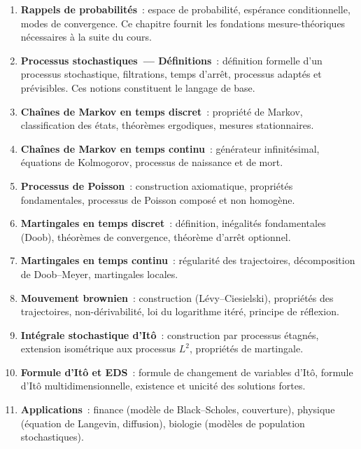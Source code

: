 \begin{enumerate}
  \item \textbf{Rappels de probabilit\'es}~: espace de probabilit\'e, esp\'erance
    conditionnelle, modes de convergence. Ce chapitre fournit les fondations
    mesure-th\'eoriques n\'ecessaires \`a la suite du cours.

  \item \textbf{Processus stochastiques~--- D\'efinitions}~: d\'efinition formelle
    d'un processus stochastique, filtrations, temps d'arr\^et, processus
    adapt\'es et pr\'evisibles. Ces notions constituent le langage de base.

  \item \textbf{Cha\^ines de Markov en temps discret}~: propri\'et\'e de Markov,
    classification des \'etats, th\'eor\`emes ergodiques, mesures stationnaires.

  \item \textbf{Cha\^ines de Markov en temps continu}~: g\'en\'erateur infinit\'esimal,
    \'equations de Kolmogorov, processus de naissance et de mort.

  \item \textbf{Processus de Poisson}~: construction axiomatique, propri\'et\'es
    fondamentales, processus de Poisson compos\'e et non homog\`ene.

  \item \textbf{Martingales en temps discret}~: d\'efinition, in\'egalit\'es
    fondamentales (Doob), th\'eor\`emes de convergence, th\'eor\`eme d'arr\^et optionnel.

  \item \textbf{Martingales en temps continu}~: r\'egularit\'e des trajectoires,
    d\'ecomposition de Doob--Meyer, martingales locales.

  \item \textbf{Mouvement brownien}~: construction (L\'evy--Ciesielski),
    propri\'et\'es des trajectoires, non-d\'erivabilit\'e, loi du logarithme it\'er\'e,
    principe de r\'eflexion.

  \item \textbf{Int\'egrale stochastique d'It\^o}~: construction par processus
    \'etagn\'es, extension isom\'etrique aux processus $L^2$, propri\'et\'es de martingale.

  \item \textbf{Formule d'It\^o et EDS}~: formule de changement de variables d'It\^o,
    formule d'It\^o multidimensionnelle, existence et unicit\'e des solutions fortes.

  \item \textbf{Applications}~: finance (mod\`ele de Black--Scholes, couverture),
    physique (\'equation de Langevin, diffusion), biologie (mod\`eles de population
    stochastiques).
\end{enumerate}

